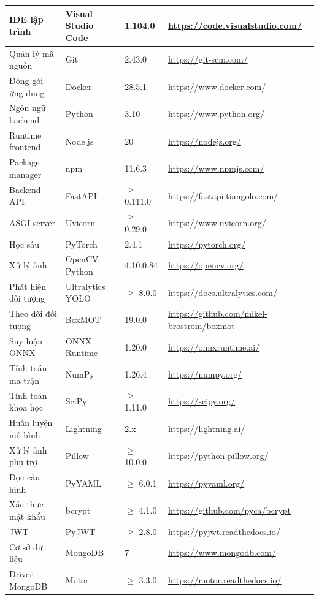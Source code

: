 \documentclass[../DoAn.tex]{subfiles}
\begin{document}
\begin{longtable}{p{3.2cm} p{4.2cm} p{2.6cm} p{4.8cm}}
IDE lập trình & Visual Studio Code & 1.104.0 & \url{https://code.visualstudio.com/} \\ \hline
Quản lý mã nguồn & Git & 2.43.0 & \url{https://git-scm.com/} \\ \hline
Đóng gói ứng dụng & Docker & 28.5.1 & \url{https://www.docker.com/} \\ \hline
Ngôn ngữ backend & Python & 3.10 & \url{https://www.python.org/} \\ \hline
Runtime frontend & Node.js & 20 & \url{https://nodejs.org/} \\ \hline
Package manager & npm & 11.6.3 & \url{https://www.npmjs.com/} \\ \hline
Backend API & FastAPI & $\geq$ 0.111.0 & \url{https://fastapi.tiangolo.com/} \\ \hline
ASGI server & Uvicorn & $\geq$ 0.29.0 & \url{https://www.uvicorn.org/} \\ \hline
Học sâu & PyTorch & 2.4.1 & \url{https://pytorch.org/} \\ \hline
Xử lý ảnh & OpenCV Python & 4.10.0.84 & \url{https://opencv.org/} \\ \hline
Phát hiện đối tượng & Ultralytics YOLO & $\geq$ 8.0.0 & \url{https://docs.ultralytics.com/} \\ \hline
Theo dõi đối tượng & BoxMOT & 19.0.0 & \url{https://github.com/mikel-brostrom/boxmot} \\ \hline
Suy luận ONNX & ONNX Runtime & 1.20.0 & \url{https://onnxruntime.ai/} \\ \hline
Tính toán ma trận & NumPy & 1.26.4 & \url{https://numpy.org/} \\ \hline
Tính toán khoa học & SciPy & $\geq$ 1.11.0 & \url{https://scipy.org/} \\ \hline
Huấn luyện mô hình & Lightning & 2.x & \url{https://lightning.ai/} \\ \hline
Xử lý ảnh phụ trợ & Pillow & $\geq$ 10.0.0 & \url{https://python-pillow.org/} \\ \hline
Đọc cấu hình & PyYAML & $\geq$ 6.0.1 & \url{https://pyyaml.org/} \\ \hline
Xác thực mật khẩu & bcrypt & $\geq$ 4.1.0 & \url{https://github.com/pyca/bcrypt} \\ \hline
JWT & PyJWT & $\geq$ 2.8.0 & \url{https://pyjwt.readthedocs.io/} \\ \hline
Cơ sở dữ liệu & MongoDB & 7 & \url{https://www.mongodb.com/} \\ \hline
Driver MongoDB & Motor & $\geq$ 3.3.0 & \url{https://motor.readthedocs.io/} \\ \hline

\end{longtable}
\end{document}
